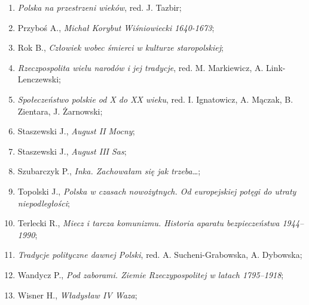 \documentclass[a4paper,11pt]{article}
\begin{document}
\begin{enumerate}
\item \textit{Polska na przestrzeni wieków}, red. J. Tazbir;



\item Przyboś A., \textit{Michał Korybut Wiśniowiecki 1640-1673};



\item Rok B., \textit{Człowiek wobec śmierci w kulturze staropolskiej};



\item \textit{Rzeczpospolita wielu narodów i jej tradycje}, red. M.
  Markiewicz, A. Link-Lenczewski;



\item \textit{Społeczeństwo polskie od X do XX wieku}, red. I.
  Ignatowicz, A. Mączak, B. Zientara, J. Żarnowski;



\item Staszewski J., \textit{August II Mocny};



\item Staszewski J., \textit{August III Sas};



\item Szubarczyk P., \textit{Inka. Zachowałam się jak trzeba\ldots};



\item Topolski J., \textit{Polska w czasach nowożytnych. Od europejskiej
    potęgi do utraty niepodległości};



\item Terlecki R., \textit{Miecz i tarcza komunizmu. Historia aparatu
    bezpieczeństwa 1944--1990};



\item \textit{Tradycje polityczne dawnej Polski}, red. A.
  Sucheni-Grabowska, A. Dybowska;



\item Wandycz P., \textit{Pod zaborami. Ziemie Rzeczypospolitej w latach
    1795--1918};



\item Wisner H., \textit{Władysław IV Waza};




\end{enumerate}
\end{document}
